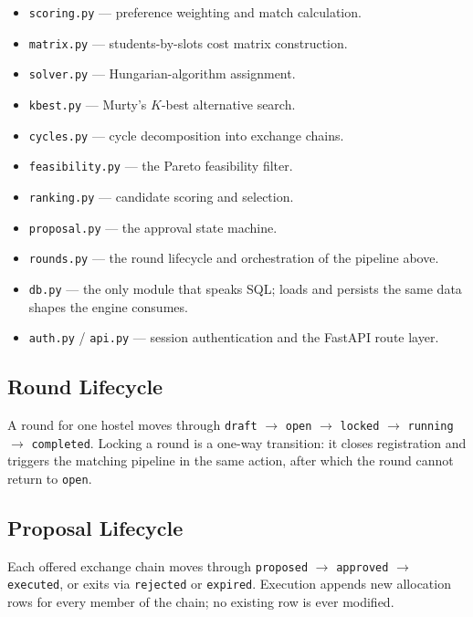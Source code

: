 \documentclass[11pt,a4paper]{report}
\begin{document}
\begin{itemize}
    \item \texttt{scoring.py} --- preference weighting and match
    calculation.
    \item \texttt{matrix.py} --- students-by-slots cost matrix
    construction.
    \item \texttt{solver.py} --- Hungarian-algorithm assignment.
    \item \texttt{kbest.py} --- Murty's $K$-best alternative search.
    \item \texttt{cycles.py} --- cycle decomposition into exchange
    chains.
    \item \texttt{feasibility.py} --- the Pareto feasibility filter.
    \item \texttt{ranking.py} --- candidate scoring and selection.
    \item \texttt{proposal.py} --- the approval state machine.
    \item \texttt{rounds.py} --- the round lifecycle and orchestration
    of the pipeline above.
    \item \texttt{db.py} --- the only module that speaks SQL; loads
    and persists the same data shapes the engine consumes.
    \item \texttt{auth.py} / \texttt{api.py} --- session
    authentication and the FastAPI route layer.
\end{itemize}

\subsection{Round Lifecycle}

A round for one hostel moves through \texttt{draft}
$\rightarrow$ \texttt{open} $\rightarrow$ \texttt{locked}
$\rightarrow$ \texttt{running} $\rightarrow$ \texttt{completed}.
Locking a round is a one-way transition: it closes registration and
triggers the matching pipeline in the same action, after which the
round cannot return to \texttt{open}.

\subsection{Proposal Lifecycle}

Each offered exchange chain moves through \texttt{proposed}
$\rightarrow$ \texttt{approved} $\rightarrow$ \texttt{executed}, or
exits via \texttt{rejected} or \texttt{expired}. Execution appends new
allocation rows for every member of the chain; no existing row is ever
modified.
\end{document}
